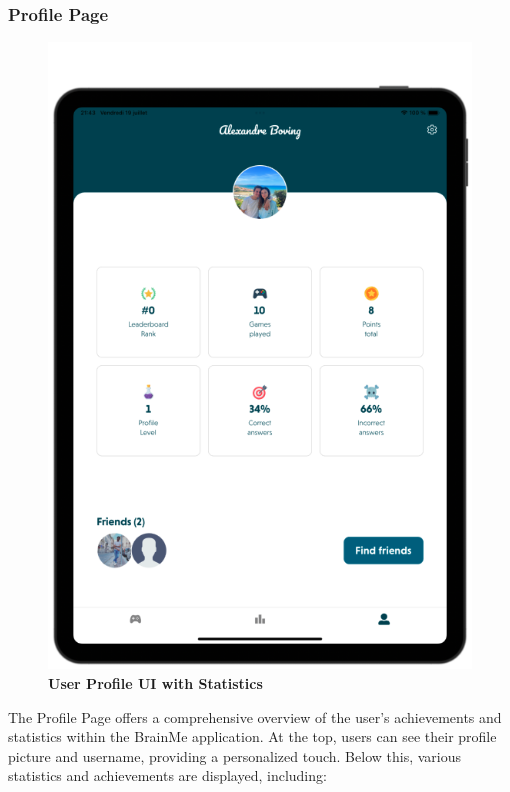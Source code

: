 \subsubsection{Profile Page}

\begin{figure}[H]
    \centering
    \begin{minipage}[b]{0.43\linewidth}
        \centering
        \includegraphics[width=\linewidth]{TabletUI/User Profile UI with Statistics.png}
        \caption{\textbf{User Profile UI with Statistics}}
    \end{minipage}
\end{figure}


The Profile Page offers a comprehensive overview of the user's achievements and statistics within the BrainMe application. At the top, users can see their profile picture and username, providing a personalized touch. Below this, various statistics and achievements are displayed, including:

